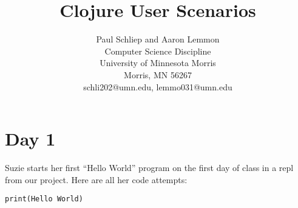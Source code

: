 \documentclass[12pt]{article}
\newcommand{\comment}[1]{}
\begin{document}
\pagestyle{plain}
%

\title{Clojure User Scenarios}
%
%

\author{
Paul Schliep and Aaron Lemmon \\
Computer Science Discipline \\
University of Minnesota Morris\\
Morris, MN 56267\\
schli202@umn.edu, lemmo031@umn.edu
}

\date{}

\maketitle
\thispagestyle{empty}




\newpage
\setcounter{page}{1}

\section{Day 1}
Suzie starts her first “Hello World” program on the first day of class in a repl from our project. Here are all her code attempts:

\verb|print(Hello World)|
\end{document}
